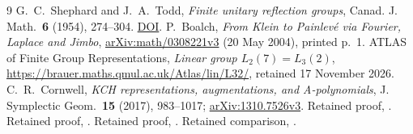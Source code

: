 \documentclass[11pt]{article}
\begin{document}
\begin{thebibliography}{9}
 G.~C.~Shephard and J.~A.~Todd,
\emph{Finite unitary reflection groups}, Canad. J. Math.\ \textbf{6}
(1954), 274--304. \href{https://doi.org/10.4153/CJM-1954-028-3}{DOI}.
 P.~Boalch, \emph{From Klein to Painlev\'e via Fourier,
Laplace and Jimbo}, \href{https://arxiv.org/abs/math/0308221v3}{arXiv:math/0308221v3}
(20 May 2004), printed p.~1.
 ATLAS of Finite Group Representations,
\emph{Linear group $L_2(7)=L_3(2)$},
\url{https://brauer.maths.qmul.ac.uk/Atlas/lin/L32/}, retained 17 November 2026.
 C.~R.~Cornwell, \emph{KCH representations, augmentations,
and A-polynomials}, J. Symplectic Geom.\ \textbf{15} (2017), 983--1017;
\href{https://arxiv.org/abs/1310.7526v3}{arXiv:1310.7526v3}.
 Retained proof, .
 Retained proof, .
 Retained proof, .
 Retained comparison,
.
\end{thebibliography}
\end{document}
